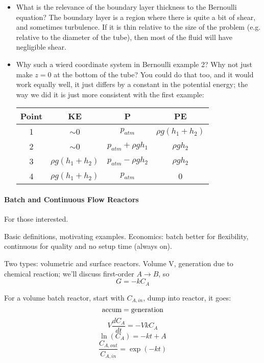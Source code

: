 \documentclass{report}
\begin{document}
\begin{itemize}
\item What is the relevance of the boundary layer thickness to the Bernoulli
  equation?  The boundary layer is a region where there is quite a bit of
  shear, and sometimes turbulence.  If it is thin relative to the size of the
  problem (e.g. relative to the diameter of the tube), then most of the fluid
  will have negligible shear.
\item Why such a wierd coordinate system in Bernoulli example 2?  Why not just
  make $z=0$ at the bottom of the tube?  You could do that too, and it would
  work equally well, it just differs by a constant in the potential energy; the
  way we did it is just more consistent with the first example:
  \begin{center}
    \begin{tabular}{c|ccc|}
      Point & KE                & P                   & PE \\ \hline
      1     & $\sim$0           & $p_{atm}$           & $\rho g(h_1+h_2)$ \\
      2     & $\sim$0           & $p_{atm}+\rho gh_1$ & $\rho gh_2$ \\
      3     & $\rho g(h_1+h_2)$ & $p_{atm}-\rho gh_2$ & $\rho gh_2$ \\
      4     & $\rho g(h_1+h_2)$ & $p_{atm}$           & 0 \\ \hline
    \end{tabular}
  \end{center}
\end{itemize}

\paragraph{Batch and Continuous Flow Reactors}

For those interested.

Basic definitions, motivating examples.  Economics: batch better for
flexibility, continuous for quality and no setup time (always on).

Two types: volumetric and surface reactors.  Volume V, generation due to
chemical reaction; we'll discuss first-order $A\longrightarrow B$, so
$$G=-kC_A$$

For a volume batch reactor, start with $C_{A,in}$, dump into reactor, it goes:
$$\rm accum = generation$$
$$V\frac{dC_A}{dt} = -VkC_A$$
$$\ln(C_A) = -kt + A$$
$$\frac{C_{A,out}}{C_{A,in}} = \exp\left(-kt\right)$$
\end{document}
